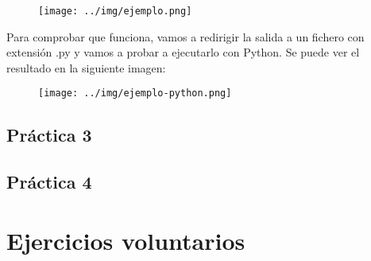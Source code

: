 \documentclass[11pt,a4paper]{article}
\begin{document}
		\begin{figure}[H]
			\centering
			\texttt{[image: ../img/ejemplo.png]}
		\end{figure}
		
		Para comprobar que funciona, vamos a redirigir la salida a un fichero con extensión .py y vamos a probar
		a ejecutarlo con Python. Se puede ver el resultado en la siguiente imagen:
		
		\begin{figure}[H]
			\centering
			\texttt{[image: ../img/ejemplo-python.png]}
		\end{figure}
	\newpage
	\subsection{Práctica 3}
	
	\newpage
	\subsection{Práctica 4}
	
	\newpage
	\section{Ejercicios voluntarios}
\end{document}
